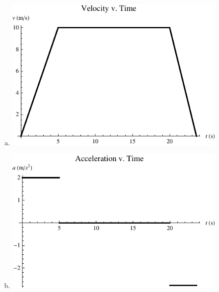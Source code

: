 \documentclass{esg8012pset}
\begin{document}
\begin{question}[Problem 2]
\begin{solution}
\begin{enumerate}[a)]
    \item \includegraphics[width=0.85\textwidth]{ps01_Plot_2}
    \item \includegraphics[width=0.85\textwidth]{ps01_Plot_3}
  \end{enumerate}
\end{solution}


\end{question}
\end{document}
